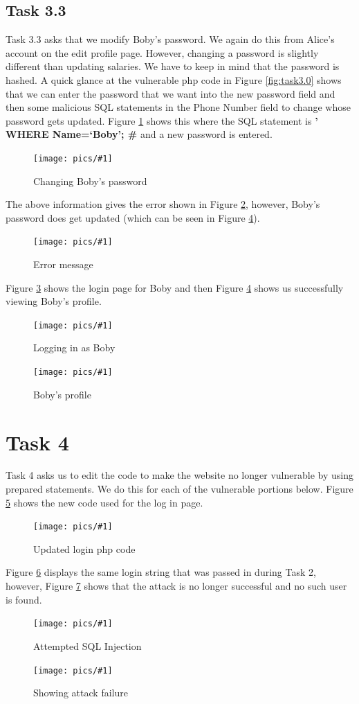 \documentclass[11pt]{article}
\newcommand{\fig}[2]{ 
\begin{figure}[h]
	\centering
	\caption{#2}
	\texttt{[image: pics/\#1]}
	\label{fig:#1}
\end{figure} 
}
\begin{document}
\newpage

\subsection*{Task 3.3}

Task 3.3 asks that we modify Boby's password. We again do this from Alice's account on the edit profile page. However, changing a password is slightly different than updating salaries. We have to keep in mind that the password is hashed. A quick glance at the vulnerable php code in Figure \ref{fig:task3.0} shows that we can enter the password that we want into the new password field and then some malicious SQL statements in the Phone Number field to change whose password gets updated. Figure \ref{fig:task3.8} shows this where the SQL statement is {\bf ' WHERE Name=`Boby'; \#} and a new password is entered.

\fig{task3.8}{Changing Boby's password}

The above information gives the error shown in Figure \ref{fig:task3.9}, however, Boby's password does get updated (which can be seen in Figure \ref{fig:task3.11}).

\fig{task3.9}{Error message}

\newpage

Figure \ref{fig:task3.10} shows the login page for Boby and then Figure \ref{fig:task3.11} shows us successfully viewing Boby's profile.

\fig{task3.10}{Logging in as Boby}

\fig{task3.11}{Boby's profile}

\newpage 

\section*{Task 4}

Task 4 asks us to edit the code to make the website no longer vulnerable by using prepared statements. We do this for each of the vulnerable portions below. Figure \ref{fig:task4.1} shows the new code used for the log in page.

\fig{task4.1}{Updated login php code}

Figure \ref{fig:task4.2} displays the same login string that was passed in during Task 2, however, Figure \ref{fig:task4.3} shows that the attack is no longer successful and no such user is found.

\fig{task4.2}{Attempted SQL Injection}

\fig{task4.3}{Showing attack failure}
\end{document}
